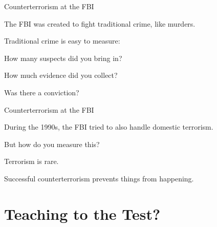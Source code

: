 \documentclass[aspectratio=169,usenames,dvipsnames]{beamer}
\newenvironment{wideitemize}{\itemize\addtolength{\itemsep}{10pt}}{\enditemize}
\begin{document}

\begin{frame}{Counterterrorism at the FBI}
    \begin{wideitemize}
        \item The FBI was created to fight traditional crime, like murders.
        \item Traditional crime is easy to measure:
        \begin{wideitemize}
            \item How many suspects did you bring in?
            \item How much evidence did you collect?
            \item Was there a conviction?
        \end{wideitemize}
        
    \end{wideitemize}
\end{frame}


\begin{frame}{Counterterrorism at the FBI}
    \begin{wideitemize}
         \item During the 1990s, the FBI tried to also handle domestic terrorism.
        \item But how do you measure this?
        \item Terrorism is rare.
        \item Successful counterterrorism prevents things from happening.
    \end{wideitemize}
\end{frame}


\section{Teaching to the Test?}
\end{document}
